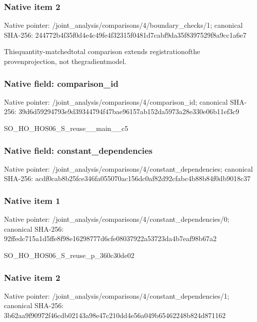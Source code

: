 \documentclass[10pt,a4paper]{article}
\begin{document}
\subsubsection{Native item 2}
Native pointer: /joint\_\allowbreak{}analysis/comparisons/4/boundary\_\allowbreak{}checks/1; canonical SHA-256: 244772b4f35f0d4e4c49fe4f32315f0481d7cabf9da35f8397529f8a9cc1a6e7

\begingroup\raggedright\sloppy Thisquantity-matchedtotal comparison extends registrationofthe provenprojection,\allowbreak{} not thegradientmodel.\par\endgroup

\subsubsection{Native field: comparison\_\allowbreak{}id}
Native pointer: /joint\_\allowbreak{}analysis/comparisons/4/comparison\_\allowbreak{}id; canonical SHA-256: 39d6d59294793e9d39344794f47bae96157ab152da5973a28e330e06b11ef3c9

\begingroup\raggedright\sloppy SO\_\allowbreak{}HO\_\allowbreak{}HOS06\_\allowbreak{}S\_\allowbreak{}reuse\_\allowbreak{}\_\allowbreak{}main\_\allowbreak{}\_\allowbreak{}c5\par\endgroup

\subsubsection{Native field: constant\_\allowbreak{}dependencies}
Native pointer: /joint\_\allowbreak{}analysis/comparisons/4/constant\_\allowbreak{}dependencies; canonical SHA-256: acdf0cab8b25fce346fa055070ac156dc0af82d92cfabc4b88b84f0db9018c37

\subsubsection{Native item 1}
Native pointer: /joint\_\allowbreak{}analysis/comparisons/4/constant\_\allowbreak{}dependencies/0; canonical SHA-256: 92ffedc715a1d5ffe8f98e16298777d6cfe08037922a53723da4b7eaf98b67a2

\begingroup\raggedright\sloppy SO\_\allowbreak{}HO\_\allowbreak{}HOS06\_\allowbreak{}S\_\allowbreak{}reuse\_\allowbreak{}p\_\allowbreak{}360c30de02\par\endgroup

\subsubsection{Native item 2}
Native pointer: /joint\_\allowbreak{}analysis/comparisons/4/constant\_\allowbreak{}dependencies/1; canonical SHA-256: 3b62aa9f90972f46cdb02143a98e47c210dd4e56a049b65462248b824d871162
\end{document}
